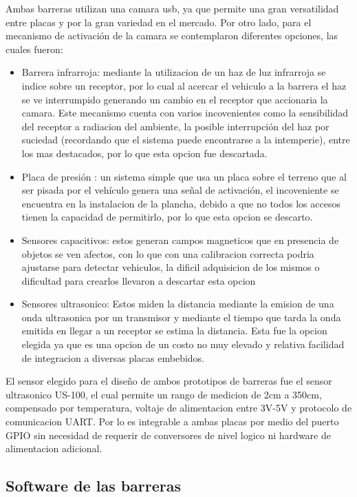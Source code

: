 Ambas barreras utilizan una camara usb, ya que permite una gran versatilidad entre placas y por la gran variedad en el mercado. Por otro lado, para el mecanismo de activación de la camara se contemplaron diferentes opciones, las cuales fueron:
\begin{itemize}
\item Barrera infrarroja: mediante la utilizacion de un haz de luz infrarroja se indice sobre un receptor, por lo cual al acercar el vehiculo a la barrera el haz se ve interrumpido generando un cambio en el receptor que accionaria la camara. Este mecanismo cuenta con varios incovenientes como la sensibilidad del receptor a radiacion del ambiente, la posible interrupción del haz por suciedad (recordando que el sistema puede encontrarse a la intemperie), entre los mas destacados, por lo que esta opcion fue descartada.
\item Placa de presión : un sistema simple que usa un placa sobre el terreno que al ser pisada por el vehículo genera una señal de activación, el incoveniente se encuentra en la instalacion de la plancha, debido a que no todos los accesos tienen la capacidad de permitirlo, por lo que esta opcion se descarto.
\item Sensores capacitivos: estos generan campos magneticos que en presencia de objetos se ven afectos, con lo que con una calibracion correcta podria ajustarse para detectar vehiculos, la dificil adquisicion de los mismos o dificultad para crearlos llevaron a descartar esta opcion
\item Sensores ultrasonico: Estos miden la distancia mediante la emision de una onda ultrasonica por un transmisor y mediante el tiempo que tarda la onda emitida en llegar a un receptor se estima la distancia. Esta fue la opcion elegida ya que es una opcion de un costo no muy elevado y relativa facilidad de integracion a diversas placas embebidos.
\end{itemize}
El sensor elegido para el diseño de ambos prototipos de barreras fue el sensor ultrasonico US-100, el cual permite un rango de medicion de 2cm a 350cm, compensado por temperatura, voltaje de alimentacion entre 3V-5V y protocolo de comunicacion UART. Por lo es integrable a ambas placas por medio del puerto GPIO sin necesidad de requerir de conversores de nivel logico ni hardware de alimentacion adicional.



\subsection{Software de las barreras}

